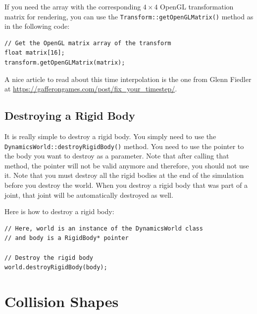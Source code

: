 \documentclass[a4paper,12pt]{article}
\begin{document}
    \vspace{0.6cm}

    If you need the array with the corresponding $4 \times 4$ OpenGL transformation matrix for rendering, you can use the \texttt{Transform::getOpenGLMatrix()} method as in the
    following code: \\

    \begin{lstlisting}
// Get the OpenGL matrix array of the transform
float matrix[16];
transform.getOpenGLMatrix(matrix);
  \end{lstlisting}

    \vspace{0.6cm}

    A nice article to read about this time interpolation is the one from Glenn Fiedler at \url{https://gafferongames.com/post/fix_your_timestep/}.

    \subsection{Destroying a Rigid Body}

    \begin{sloppypar}
    It is really simple to destroy a rigid body. You simply need to use the \texttt{DynamicsWorld::destroyRigidBody()} method. You need to use the pointer to the body you
    want to destroy as a parameter. Note that after calling that method, the pointer will not be valid anymore and therefore, you should not use it. Note that you must
    destroy all the rigid bodies at the end of the simulation before you destroy the world. When you destroy a rigid body that was part of a joint, that joint will be
    automatically destroyed as well. \\
    \end{sloppypar}

    Here is how to destroy a rigid body: \\

    \begin{lstlisting}
// Here, world is an instance of the DynamicsWorld class
// and body is a RigidBody* pointer

// Destroy the rigid body
world.destroyRigidBody(body);
  \end{lstlisting}

    \section{Collision Shapes}
    \label{sec:collisionshapes}
\end{document}
